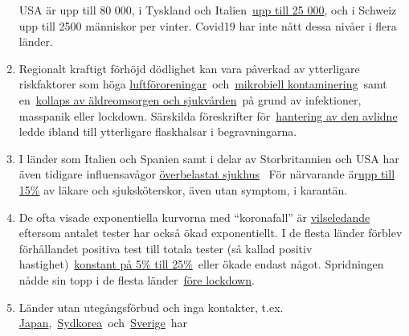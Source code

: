 \begin{enumerate}
  USA är upp till 80 000, i Tyskland och
  Italien~\href{https://www.sciencedirect.com/science/article/pii/S1201971219303285}{upp
  till 25 000}, och i Schweiz upp till 2500 människor per vinter.
  Covid19 har inte nått dessa nivåer i flera länder.
\item
  Regionalt kraftigt förhöjd dödlighet kan vara påverkad av ytterligare
  riskfaktorer som höga
  \href{https://www.heise.de/tp/features/Feinstaubpartikel-als-Viren-Vehikel-4687454.html}{luftföroreningar}~och~\href{https://www.ansa.it/english/news/science_tecnology/2019/11/19/italy-top-in-eu-in-antibiotic-resistance_369e0123-0107-445e-8c17-f11932c9d27c.html}{mikrobiell
  kontaminering}~samt
  en~\href{https://swprs.org/covid19-bericht-aus-italien/}{kollaps av
  äldreomsorgen och sjukvården}~på grund av infektioner, masspanik eller
  lockdown. Särskilda föreskrifter
  för~\href{https://www.ecdc.europa.eu/sites/default/files/documents/COVID-19-safe-handling-of-bodies-or-persons-dying-from-COVID19.pdf}{hantering
  av den avlidne} ledde ibland till ytterligare flaskhalsar i
  begravningarna.
\item
  I länder som Italien och Spanien samt i delar av Storbritannien och
  USA har även tidigare influensavågor
  \href{https://off-guardian.org/2020/04/02/coronavirus-fact-check-1-flu-doesnt-overwhelm-our-hospitals/}{överbelastat
  sjukhus}~ För närvarande
  är\href{https://www.reuters.com/article/us-health-coronavirus-spain-morgue-idUSKBN21B1PP}{upp
  till 15\%} av läkare och sjuksköterskor, även utan symptom, i
  karantän.
\item
  De ofta visade exponentiella kurvorna med ``koronafall'' är
  \href{https://multipolar-magazin.de/artikel/coronavirus-irrefuhrung-fallzahlen}{vilseledande}~
  eftersom antalet tester har också ökad exponentiellt. I de flesta
  länder förblev förhållandet positiva test till totala tester (så
  kallad positiv
  hastighet)~\href{https://swprs.org/rate-of-positive-covid19-tests/}{konstant
  på 5\% till 25\%}~eller ökade endast något. Spridningen nådde sin topp
  i de flesta
  länder~\href{https://infekt.ch/2020/04/sind-wir-tatsaechlich-im-blindflug/}{före
  lockdown}.
\item
  Länder utan utegångsförbud och inga kontakter, t.ex.
  \href{https://www.japantimes.co.jp/news/2020/03/20/national/coronavirus-explosion-expected-japan/}{Japan},~\href{https://www.businessinsider.com/south-korea-coronavirus-testing-death-rate-2020-3?op=1}{Sydkorea}~och~\href{https://www.washingtontimes.com/news/2020/apr/15/sweden-coronavirus-rates-easing-despite-loose-rule/}{Sverige}~har

\end{enumerate}
